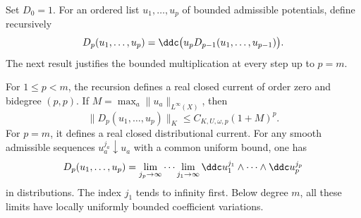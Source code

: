 Set $D_0=1$. For an ordered list $u_1,\ldots,u_p$ of bounded
admissible potentials, define recursively
\begin{equation}\label{eq:hessian-bounded-recursion}
 D_p(u_1,\ldots,u_p)
 =\ddc\bigl(u_pD_{p-1}(u_1,\ldots,u_{p-1})\bigr).
\end{equation}
The next result justifies the bounded multiplication at every step up
to $p=m$.

\begin{proposition}\label{hessian:bounded-recursive-currents}
For $1\leq p<m$, the recursion defines a real closed current of order
zero and bidegree $(p,p)$. If
$M=\max_a\|u_a\|_{L^\infty(X)}$, then
\[
 \|D_p(u_1,\ldots,u_p)\|_K
       \leq C_{K,U,\omega,p}(1+M)^p.
\]
For $p=m$, it defines a real closed distributional current. For any
smooth admissible sequences $u_a^{j_a}\downarrow u_a$ with a common
uniform bound, one has
\begin{equation}\label{eq:hessian-bounded-iterated-limit}
 D_p(u_1,\ldots,u_p)
 =\lim_{j_p\to\infty}\cdots\lim_{j_1\to\infty}
    \ddc u_1^{j_1}\wedge\cdots\wedge\ddc u_p^{j_p}
\end{equation}
in distributions. The index $j_1$ tends to infinity first. Below degree
$m$, all these limits have locally uniformly bounded coefficient
variations.
\end{proposition}
